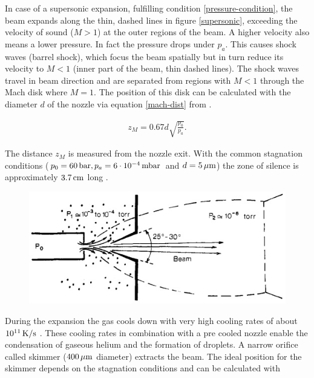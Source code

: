 \documentclass[parskip,12pt,headsepline,a4paper] {scrbook}
\begin{document}
In case of a supersonic expansion, fulfilling condition \ref{pressure-condition}, the beam expands along the thin, dashed lines in figure \ref{supersonic}, exceeding the velocity of sound ($M > 1$) at the outer regions of the beam. A higher velocity also means a lower pressure. In fact the pressure drops under $p_a$. This causes shock waves (barrel shock), which focus the beam spatially but in turn reduce its velocity to $M < 1$ (inner part of the beam, thin dashed lines). The shock waves travel in beam direction and are separated from regions with $M < 1$ through the Mach disk where $M = 1$. The position of this disk can be calculated with the diameter $d$ of the nozzle via equation \ref{mach-dist} from \cite{pauly}.

\begin{align}  \label{mach-dist}
z_M = 0.67d\sqrt{\frac{p_0}{p_a}}.
\end{align}

The distance $z_M$ is measured from the nozzle exit. With the common stagnation conditions ($p_0 = \unit[60]{bar}, p_a = \unit[6\cdot10^{-4}]{mbar}$ and $d = \unit[5]{\mu m}$) the zone of silence is approximately $\unit[3.7]{cm}$ long \cite{skimmer-pos}.

\begin{figure}[ht]
\centerline{
\includegraphics[width=13cm]{./expansion/with-skimmer.jpg}}
\end{figure}

During the expansion the gas cools down with very high cooling rates of about $\unit[10^{11}]{K/s}$ \cite{stein}. These cooling rates in combination with a pre cooled nozzle enable the condensation of gaseous helium and the formation of droplets. A narrow orifice called skimmer ($\unit[400]{\mu m}$ diameter) extracts the beam. The ideal position for the skimmer depends on the stagnation conditions and can be calculated with
\end{document}
